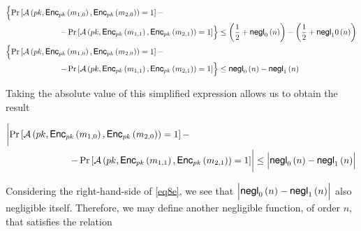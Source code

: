 \documentclass[../CryptoFinal.tex]{subfiles}
\begin{document}
\begin{flushleft}
\begin{align*}
  &\Bigl\{ \Pr \left[ \mathcal{A} \left( pk,  \text{{\fontfamily{phv}\selectfont Enc}}_{pk} \left( m_{1, 0} \right), \text{{\fontfamily{phv}\selectfont Enc}}_{pk} \left( m_{2, 0} \right) \right) = 1 \right] - \Bigr. \\
  &\Bigl. \qquad \qquad \qquad \quad - \Pr \left[ \mathcal{A} \left( pk,  \text{{\fontfamily{phv}\selectfont Enc}}_{pk} \left( m_{1, 1} \right), \text{{\fontfamily{phv}\selectfont Enc}}_{pk} \left( m_{2, 1} \right) \right) = 1 \right] \Bigr\} \leq \left( \frac{1}{2} + \text{{\fontfamily{phv}\selectfont negl}}_0 \left( n \right) \right) - \left( \frac{1}{2} + \text{{\fontfamily{phv}\selectfont negl}}_10 \left( n \right) \right) \\
  &\Bigl\{ \Pr \left[ \mathcal{A} \left( pk,  \text{{\fontfamily{phv}\selectfont Enc}}_{pk} \left( m_{1, 0} \right), \text{{\fontfamily{phv}\selectfont Enc}}_{pk} \left( m_{2, 0} \right) \right) = 1 \right] - \Bigr. \\
  &\Bigl. \qquad \qquad \qquad \quad - \Pr \left[ \mathcal{A} \left( pk,  \text{{\fontfamily{phv}\selectfont Enc}}_{pk} \left( m_{1, 1} \right), \text{{\fontfamily{phv}\selectfont Enc}}_{pk} \left( m_{2, 1} \right) \right) = 1 \right] \Bigr\} \leq \text{{\fontfamily{phv}\selectfont negl}}_0 \left( n \right) - \text{{\fontfamily{phv}\selectfont negl}}_1 \left( n \right)
\end{align*}

Taking the absolute value of this simplified expression allows us to obtain the result

\begin{align}
  &\biggl| \Pr \left[ \mathcal{A} \left( pk,  \text{{\fontfamily{phv}\selectfont Enc}}_{pk} \left( m_{1, 0} \right), \text{{\fontfamily{phv}\selectfont Enc}}_{pk} \left( m_{2, 0} \right) \right) = 1 \right] - \biggr. \notag \\
  &\biggl. \qquad \qquad \qquad \quad - \Pr \left[ \mathcal{A} \left( pk,  \text{{\fontfamily{phv}\selectfont Enc}}_{pk} \left( m_{1, 1} \right), \text{{\fontfamily{phv}\selectfont Enc}}_{pk} \left( m_{2, 1} \right) \right) = 1 \right] \biggr| \leq \Bigl| \text{{\fontfamily{phv}\selectfont negl}}_0 \left( n \right) - \text{{\fontfamily{phv}\selectfont negl}}_1 \left( n \right) \Bigr|  \label{eq8e}
\end{align}

Considering the right-hand-side of \ref{eq8e}, we see that $\Bigl| \text{{\fontfamily{phv}\selectfont negl}}_0 \left( n \right) - \text{{\fontfamily{phv}\selectfont negl}}_1 \left( n \right) \Bigr|$ also negligible itself.  Therefore, we may define another negligible function, of order $n$, that satisfies the relation


\end{flushleft}
\end{document}
